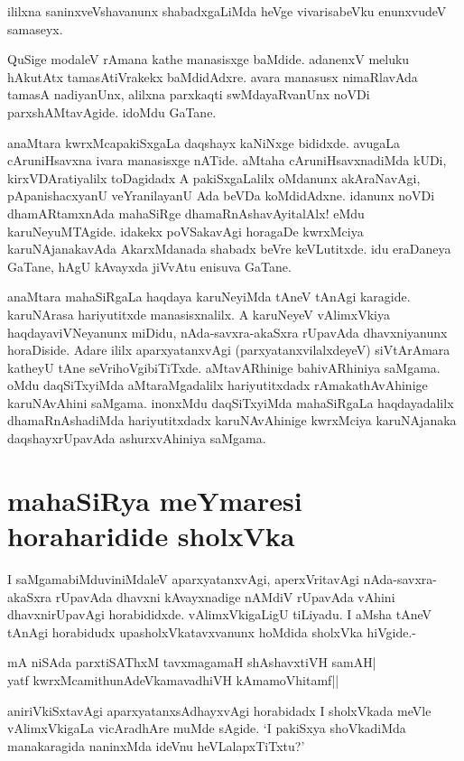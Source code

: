 ililxna saninxveVshavanunx shabadxgaLiMda heVge vivarisabeVku enunxvudeV samaseyx. 

QuSige modaleV rAmana kathe manasisxge baMdide. adanenxV meluku hAkutAtx tamasAtiVrakekx baMdidAdxre. avara manasusx nimaRlavAda tamasA nadiyanUnx, alilxna parxkaqti swMdayaRvanUnx noVDi parxshAMtavAgide. idoMdu GaTane. 

anaMtara kwrxMcapakiSxgaLa daqshayx kaNiNxge bididxde. avugaLa cAruniHsavxna ivara manasisxge nATide. aMtaha cAruniHsavxnadiMda kUDi, kirxVDAratiyalilx toDagidadx A pakiSxgaLalilx oMdanunx akAraNavAgi, pApanishacxyanU veYranilayanU Ada beVDa koMdidAdxne. idanunx noVDi dhamARtamxnAda mahaSiRge dhamaRnAshavAyitalAlx! eMdu karuNeyuMTAgide. idakekx poVSakavAgi horagaDe kwrxMciya karuNAjanakavAda AkarxMdanada shabadx beVre keVLutitxde. idu eraDaneya GaTane, hAgU kAvayxda jiVvAtu enisuva GaTane. 

anaMtara mahaSiRgaLa haqdaya karuNeyiMda tAneV tAnAgi karagide. karuNArasa hariyutitxde manasisxnalilx. A karuNeyeV vAlimxVkiya haqdayaviVNeyanunx miDidu, nAda-savxra-akaSxra rUpavAda dhavxniyanunx horaDiside. Adare ililx aparxyatanxvAgi (parxyatanxvilalxdeyeV) siVtArAmara katheyU tAne seVrihoVgibiTiTxde. aMtavARhinige bahivARhiniya saMgama. oMdu daqSiTxyiMda aMtaraMgadalilx hariyutitxdadx rAmakathAvAhinige karuNAvAhini saMgama. inonxMdu daqSiTxyiMda mahaSiRgaLa haqdayadalilx dhamaRnAshadiMda hariyutitxdadx karuNAvAhinige kwrxMciya karuNAjanaka daqshayxrUpavAda ashurxvAhiniya saMgama. 

\section*{mahaSiRya meYmaresi horaharidide sholxVka} 

I saMgamabiMduviniMdaleV aparxyatanxvAgi, aperxVritavAgi nAda-savxra-akaSxra rUpavAda dhavxni kAvayxnadige nAMdiV rUpavAda vAhini dhavxnirUpavAgi horabididxde. vAlimxVkigaLigU tiLiyadu. I aMsha tAneV tAnAgi horabidudx upasholxVkatavxvanunx hoMdida sholxVka hiVgide.- 

\begin{shloka}
mA niSAda parxtiSAThxM tavxmagamaH shAshavxtiVH samAH|\label{200}\\ 
yatf kwrxMcamithunAdeVkamavadhiVH kAmamoVhitamf||
\end{shloka}

aniriVkiSxtavAgi aparxyatanxsAdhayxvAgi horabidadx I sholxVkada meVle vAlimxVkigaLa vicAradhAre muMde sAgide. `I pakiSxya shoVkadiMda manakaragida naninxMda ideVnu heVLalapxTiTxtu?' 

